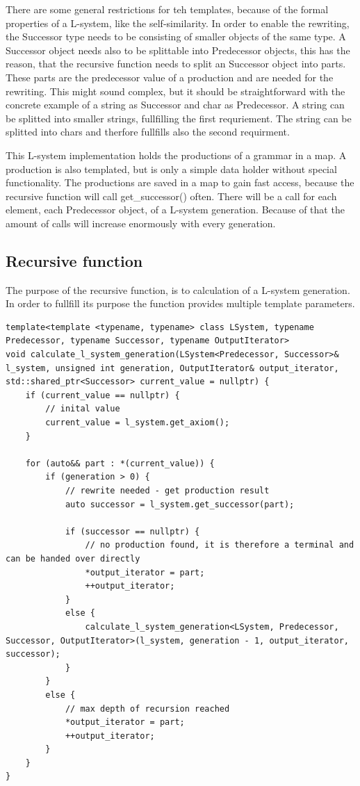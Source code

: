 \documentclass[english]{cpp-hmwk}
\begin{document}
\noindent There are some general restrictions for teh templates, because of the formal properties of a L-system, like the self-similarity. In order to enable the rewriting, the Successor type needs to be consisting of smaller objects of the same type. A Successor object needs also to be splittable into Predecessor objects, this has the reason, that the recursive function needs to split an Successor object into parts. These parts are the predecessor value of a production and are needed for the rewriting.
This might sound complex, but  it should be straightforward with the concrete example of a string as Successor and char as Predecessor. A string can be splitted into smaller strings, fullfilling the first requriement. The string can be splitted into chars and therfore fullfills also the second requirment.

This L-system implementation holds the productions of a grammar in a map. A production is also templated, but is only a simple data holder without special functionality. The productions are saved in a map to gain fast access, because the recursive function will call get\_successor() often. There will be a call for each element, each Predecessor object, of a L-system generation. Because of that the amount of calls will increase enormously with every generation.

\subsection{Recursive function}
The purpose of the recursive function, is to calculation of a L-system generation. In order to fullfill its purpose the function provides multiple template parameters.

\medskip
\begin{lstlisting}
template<template <typename, typename> class LSystem, typename Predecessor, typename Successor, typename OutputIterator>
void calculate_l_system_generation(LSystem<Predecessor, Successor>& l_system, unsigned int generation, OutputIterator& output_iterator, std::shared_ptr<Successor> current_value = nullptr) {
    if (current_value == nullptr) {
        // inital value
        current_value = l_system.get_axiom();
    }

    for (auto&& part : *(current_value)) {
        if (generation > 0) {
            // rewrite needed - get production result
            auto successor = l_system.get_successor(part);

            if (successor == nullptr) {
                // no production found, it is therefore a terminal and can be handed over directly
                *output_iterator = part;
                ++output_iterator;
            }
            else {
                calculate_l_system_generation<LSystem, Predecessor, Successor, OutputIterator>(l_system, generation - 1, output_iterator, successor);
            }
        }
        else {
            // max depth of recursion reached
            *output_iterator = part;
            ++output_iterator;
        }
    }
}

\end{lstlisting}
\end{document}
